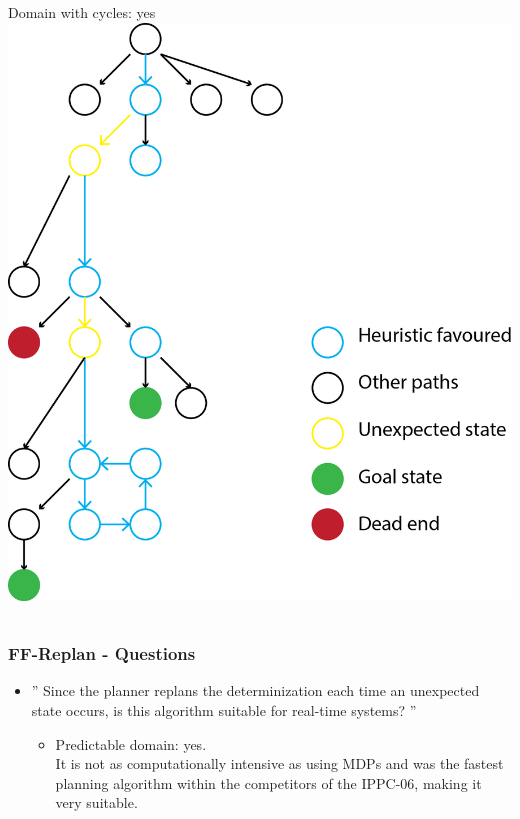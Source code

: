 \documentclass{beamer}
\let\origframetitle=\frametitle
\renewcommand\frametitle[1]{\origframetitle{\textbf{\large{\textrm{#1}}}}}
\begin{document}
\begin{frame}
\begin{columns}
 Domain with cycles: yes
\includegraphics[scale=0.4]{images/Question1b.png}
\end{columns}
\end{frame}


\begin{frame}
  \frametitle{FF-Replan - Questions}
  \begin{itemize}
	\item '' Since the planner replans the determinization each time an unexpected state occurs, is this algorithm suitable for real-time systems? ''

	\begin{itemize}
		\item Predictable domain: yes. \\
It is not as computationally intensive as using MDPs  and was the fastest planning algorithm within the competitors of the IPPC-06, making it very suitable.

	\end{itemize}

   \end{itemize}
\end{frame}
\end{document}
